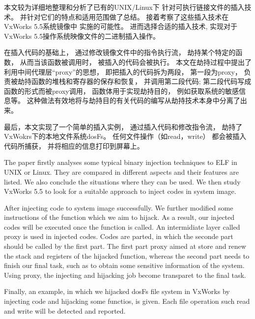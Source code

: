 \begin{cabstract}
本文较为详细地整理和分析了已有的UNIX/Linux下
针对可执行链接文件的插入技术。
并针对它们的特点和适用范围做了总结。
接着考察了这些插入技术在VxWorks 5.5系统镜像中
实施的可能性。
进而选择合适的插入技术,
实现对于VxWorks 5.5操作系统映像文件的二进制插入操作。


在插入代码的基础上，
通过修改镜像文件中的指令执行流，
劫持某个特定的函数，
从而当该函数被调用时，
被插入的代码会被执行。
本文在劫持过程中提出了利用中间代理层“proxy”的思想，
即把插入的代码拆为两段，
第一段为proxy，
负责被劫持函数的堆栈和寄存器的保存和恢复，
并调用第二段代码;
第二段代码写成函数的形式而被proxy调用，
函数体用于实现劫持目的，
例如获取系统的敏感信息等。
这种做法有效地将与劫持目的有关代码的编写从劫持技术本身中分离了出来。

最后，本文实现了一个简单的插入实例，
通过插入代码和修改指令流，
劫持了VxWokrs下的本地文件系统dosFs。
任何文件操作（如read，write）
都会被插入代码所捕获，
并将相应的信息打印到屏幕上。

\end{cabstract}
\begin{eabstract}
The paper firstly analyses some typical 
binary injection techniques to ELF in UNIX or Linux.
They are compared in different aspects and their features are listed.
We also conclude the situations where they can be used. 
We then study VxWorks 5.5 to look for a suitable approach to 
inject codes in system image.

After injecting code to system image successfully. 
We further modified some 
instructions of the function which we aim to hijack.
As a result, 
our injected codes will be executed once the function is called. 
An intermidiate layer called proxy is used in injected codes.
Codes are parted, in which the seconde part should be called by 
the first part.
The first part proxy aimed at store and renew the stack and 
registers of the hijacked function, 
whereas the second part needs to finish our final task,
such as to obtain some sensitive information of the system.
Using proxy, the injecting and hijacking job become transparet 
to the final task. 

Finally, an example, in which we hijacked dosFs file system 
in VxWorks by injecting code and hijacking some functios, is given.
Each file operation such read and write will be 
detected and reported.   





\end{eabstract}
